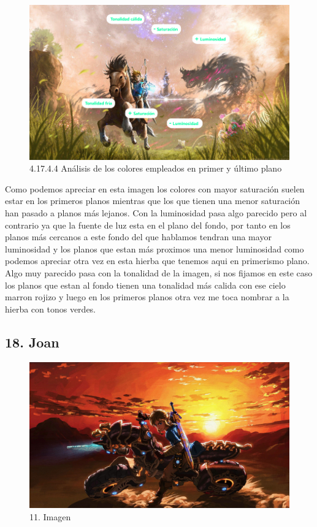 \documentclass[12pt]{article}
\begin{document}
        \begin{figure}[H]
          \centering
          \includegraphics[scale=0.7]{images/Saúl/Sección 17/EA_img17_4Color_4AnalisisPlanosPrimeroFondo.png}
          \caption{\small 4.17.4.4 Análisis de los colores empleados en primer y último plano}
        \end{figure}
        Como podemos apreciar en esta imagen los colores con mayor saturación suelen estar en los primeros planos mientras que los que tienen una menor saturación han pasado a planos más lejanos. Con la luminosidad pasa algo parecido pero al contrario ya que la fuente de luz esta en el plano del fondo, por tanto en los planos más cercanos a este fondo del que hablamos tendran una mayor luminosidad y los planos que estan más proximos una menor luminosidad como podemos apreciar otra vez en esta hierba que tenemos aqui en primerismo plano. Algo muy parecido pasa con la tonalidad de la imagen, si nos fijamos en este caso los planos que estan al fondo tienen una tonalidad más calida con ese cielo marron rojizo y luego en los primeros planos otra vez me toca nombrar a la hierba con tonos verdes.

        \newpage


    \subsection{18. Joan}
        \begin{figure}[H]
          \centering
          \includegraphics[scale=0.20]{images/Concepts/18_concept_art.jpg}
          \caption{\small 11. Imagen}
        \end{figure}
\end{document}
